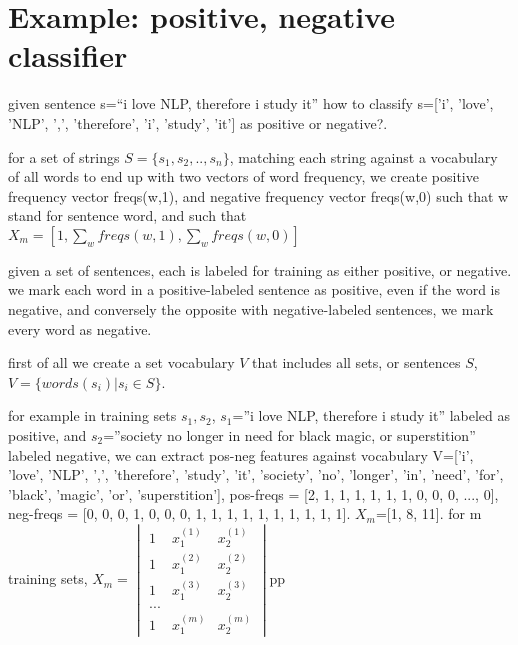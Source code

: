 \documentclass[4apaper,12pt]{book}
\begin{document}
  \section{Example: positive, negative classifier}
  \begin{description}
  \item given sentence s=``i love NLP, therefore i study it'' how to classify s=['i', 'love', 'NLP', ',', 'therefore', 'i', 'study', 'it']  as positive or negative?.
  \item for a set of strings $S=\{s_1, s_2, .., s_n\}$, matching each string against a vocabulary of all words to end up with two vectors of word frequency, we create positive frequency vector freqs(w,1), and negative frequency vector freqs(w,0) such that w stand for sentence word, and such that $X_m=[1, \sum_{w}freqs(w,1), \sum_{w}freqs(w,0)]$
  \item given a set of sentences, each is labeled for training as either positive, or negative. we mark each word in a positive-labeled sentence as positive, even if the word is negative, and conversely the opposite with negative-labeled sentences, we mark every word as negative.
\item first of all we create a set vocabulary $V$ that includes all sets, or sentences $S$, $V=\{words(s_i) | s_i \in{S}\}$.
\item for example in training sets ${s_1, s_2}$, $s_1$=''i love NLP, therefore i study it'' labeled as positive, and $s_2$=''society no longer in need for black magic, or superstition'' labeled negative, we can extract pos-neg features against vocabulary V=['i', 'love', 'NLP', ',', 'therefore', 'study', 'it', 'society', 'no', 'longer', 'in', 'need', 'for', 'black', 'magic', 'or', 'superstition'], pos-freqs = [2, 1, 1, 1, 1, 1, 1, 0, 0, 0, ..., 0], neg-freqs = [0, 0, 0, 1, 0, 0, 0, 1, 1, 1, 1, 1, 1, 1, 1, 1, 1]. $X_m$=[1, 8, 11]. for m training sets, $X_{m}=\begin{vmatrix}1&x_1^{(1)}&x_2^{(1)}\\1&x_1^{(2)}&x_2^{(2)}\\1&x_1^{(3)}&x_2^{(3)}\\...\\1&x_1^{(m)}&x_2^{(m)}\end{vmatrix}$pp
  \end{description}
\end{document}

